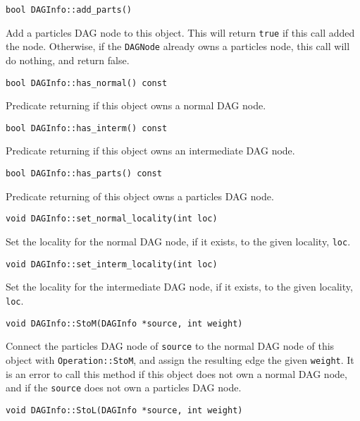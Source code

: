 \begin{lstlisting}
bool DAGInfo::add_parts()
\end{lstlisting}


Add a particles DAG node to this object. This will return \texttt{true} if this
call added the node. Otherwise, if the \texttt{DAGNode} already owns a particles
node, this call will do nothing, and return false.

\begin{lstlisting}
bool DAGInfo::has_normal() const
\end{lstlisting}

Predicate returning if this object owns a normal DAG node.

\begin{lstlisting}
bool DAGInfo::has_interm() const
\end{lstlisting}


Predicate returning if this object owns an intermediate DAG node.

\begin{lstlisting}
bool DAGInfo::has_parts() const
\end{lstlisting}


Predicate returning of this object owns a particles DAG node.

\begin{lstlisting}
void DAGInfo::set_normal_locality(int loc)
\end{lstlisting}


Set the locality for the normal DAG node, if it exists, to the given
locality, \texttt{loc}.

\begin{lstlisting}
void DAGInfo::set_interm_locality(int loc)
\end{lstlisting}


Set the locality for the intermediate DAG node, if it exists, to the given
locality, \texttt{loc}.

\begin{lstlisting}
void DAGInfo::StoM(DAGInfo *source, int weight)
\end{lstlisting}


Connect the particles DAG node of \texttt{source} to the normal DAG node of
this object with \texttt{Operation::StoM}, and assign the resulting edge the
given \texttt{weight}. It is an error to call this method if this object does
not own a normal DAG node, and if the \texttt{source} does not own a particles
DAG node.

\begin{lstlisting}
void DAGInfo::StoL(DAGInfo *source, int weight)
\end{lstlisting}


